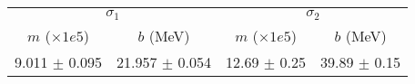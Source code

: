 \begin{tabular}{cc|cc}
\multicolumn{2}{c|}{$\sigma_1$} & \multicolumn{2}{|c}{$\sigma_2$} \\
$m$ ($\times1e5$) & $b$ (MeV) & $m$ ($\times1e5$) & $b$ (MeV) \\
\hline
9.011 $\pm$ 0.095 & 21.957 $\pm$ 0.054 & 12.69 $\pm$ 0.25 & 39.89 $\pm$ 0.15\\
\end{tabular}
